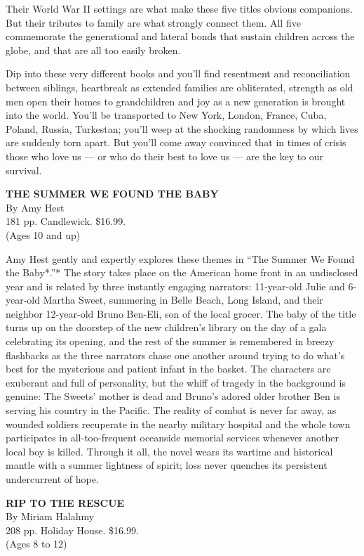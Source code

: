 Their World War II settings are what make these five titles obvious
companions. But their tributes to family are what strongly connect them.
All five commemorate the generational and lateral bonds that sustain
children across the globe, and that are all too easily broken.

Dip into these very different books and you'll find resentment and
reconciliation between siblings, heartbreak as extended families are
obliterated, strength as old men open their homes to grandchildren and
joy as a new generation is brought into the world. You'll be transported
to New York, London, France, Cuba, Poland, Russia, Turkestan; you'll
weep at the shocking randomness by which lives are suddenly torn apart.
But you'll come away convinced that in times of crisis those who love us
--- or who do their best to love us --- are the key to our survival.

\textbf{THE SUMMER WE FOUND THE BABY}\\
By Amy Hest\\
181 pp. Candlewick. \$16.99.\\
(Ages 10 and up)

Amy Hest gently and expertly explores these themes in ``The Summer We
Found the Baby*.''* The story takes place on the American home front in
an undisclosed year and is related by three instantly engaging
narrators: 11-year-old Julie and 6-year-old Martha Sweet, summering in
Belle Beach, Long Island, and their neighbor 12-year-old Bruno Ben-Eli,
son of the local grocer. The baby of the title turns up on the doorstep
of the new children's library on the day of a gala celebrating its
opening, and the rest of the summer is remembered in breezy flashbacks
as the three narrators chase one another around trying to do what's best
for the mysterious and patient infant in the basket. The characters are
exuberant and full of personality, but the whiff of tragedy in the
background is genuine: The Sweets' mother is dead and Bruno's adored
older brother Ben is serving his country in the Pacific. The reality of
combat is never far away, as wounded soldiers recuperate in the nearby
military hospital and the whole town participates in all-too-frequent
oceanside memorial services whenever another local boy is killed.
Through it all, the novel wears its wartime and historical mantle with a
summer lightness of spirit; loss never quenches its persistent
undercurrent of hope.

\textbf{RIP TO THE RESCUE}\\
By Miriam Halahmy\\
208 pp. Holiday House. \$16.99.\\
(Ages 8 to 12)

